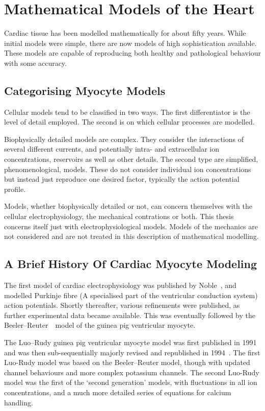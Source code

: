 \section{Mathematical Models of the Heart}

Cardiac tissue has been modelled mathematically for about fifty years.
While initial models were simple, there are now models of high sophistication
available.
These models are capable of reproducing both healthy and pathological behaviour
with some accuracy.

\subsection{Categorising Myocyte Models}

Cellular models tend to be classified in two ways.
The first differentiator is the level of detail employed.
The second is on which cellular processes are modelled.

Biophysically detailed models are complex.
They consider the interactions of several different currents, and potentially
intra- and extracellular ion concentrations, reservoirs as well as other
details.
The second type are simplified, phenomenological, models.
These do not consider individual ion concentrations but instead just reproduce
one desired factor, typically the action potential profile.

Models, whether biophysically detailed or not, can concern themselves with the
cellular electrophysiology, the mechanical contrations or both.
This thesis concerns itself just with electrophysiological models.
Models of the mechanics are not considered and are not treated in this
description of mathematical modelling.

\subsection{A Brief History Of Cardiac Myocyte Modeling}

The first model of cardiac electrophysiology was published by
Noble~\cite{Noble1962}, and modelled Purkinje fibre (A specialised part of the
ventricular conduction system) action potentials.
Shortly thereafter, various refinements were published, as further experimental
data became available.
This was eventually followed by the Beeler--Reuter~\cite{Beeler1977}\ model of
the guinea pig ventricular myocyte.

The Luo--Rudy guinea pig ventricular myocyte model was first published in
1991~\cite{LR1991} and was then sub-sequentially majorly revised and
republished in 1994~\cite{LR1994}.
The first Luo-Rudy model was based on the Beeler--Reuter model, though with updated channel behaviours
and more complex potassium channels.
The second Luo-Rudy model was the first of the `second generation' models,
with fluctuations in all ion concentrations, and a much more detailed series of
equations for calcium handling.

